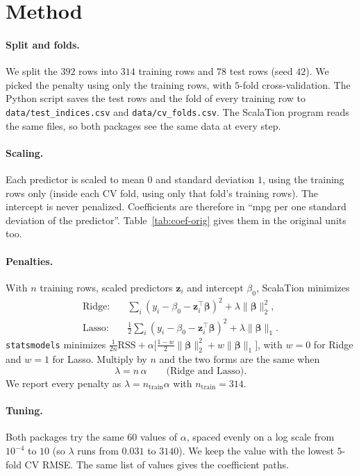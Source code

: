 \documentclass[11pt]{article}
\newcommand{\bb}{\boldsymbol{\beta}}
\begin{document}
\section{Method}

\paragraph{Split and folds.} We split the $392$ rows into $314$ training rows and $78$ test rows (seed $42$). We picked the
penalty using only the training rows, with $5$-fold cross-validation. The Python script saves the test rows and the fold of
every training row to \texttt{data/test\_indices.csv} and \texttt{data/cv\_folds.csv}. The ScalaTion program reads the same
files, so both packages see the same data at every step.

\paragraph{Scaling.} Each predictor is scaled to mean $0$ and standard deviation $1$, using the training rows only (inside
each CV fold, using only that fold's training rows). The intercept is never penalized. Coefficients are therefore in
``mpg per one standard deviation of the predictor''. Table~\ref{tab:coef-orig} gives them in the original units too.

\paragraph{Penalties.} With $n$ training rows, scaled predictors $\mathbf z_i$ and intercept $\beta_0$, ScalaTion minimizes
\begin{align*}
\text{Ridge:}\quad & \sum_i (y_i-\beta_0-\mathbf z_i^\top\bb)^2+\lambda\|\bb\|_2^2,\\
\text{Lasso:}\quad & \tfrac12\sum_i (y_i-\beta_0-\mathbf z_i^\top\bb)^2+\lambda\|\bb\|_1 .
\end{align*}
\texttt{statsmodels} minimizes $\frac{1}{2n}\mathrm{RSS}+\alpha\big[\tfrac{1-w}{2}\|\bb\|_2^2+w\|\bb\|_1\big]$, with $w=0$ for Ridge
and $w=1$ for Lasso. Multiply by $n$ and the two forms are the same when
\[
\lambda = n\,\alpha \qquad\text{(Ridge and Lasso)}.
\]
We report every penalty as $\lambda=n_{\text{train}}\alpha$ with $n_{\text{train}}=314$.

\paragraph{Tuning.} Both packages try the same $60$ values of $\alpha$, spaced evenly on a log scale from $10^{-4}$ to $10$
(so $\lambda$ runs from $0.031$ to $3140$). We keep the value with the lowest $5$-fold CV RMSE. The same list of values gives
the coefficient paths.
\end{document}
